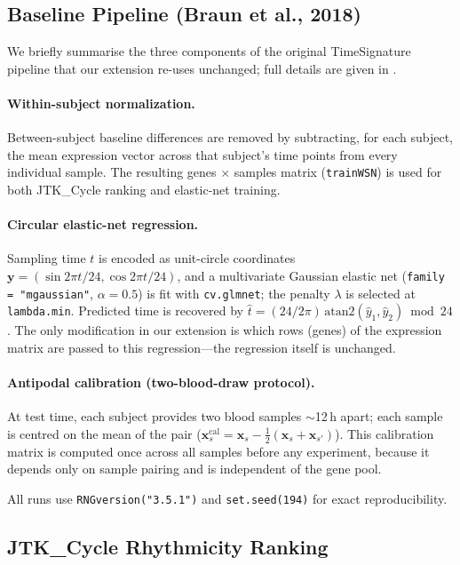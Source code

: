 \documentclass[10pt,a4paper]{article}
\begin{document}
\subsection{Baseline Pipeline (Braun et al., 2018)}
 
We briefly summarise the three components of the original
TimeSignature pipeline that our extension re-uses unchanged; full
details are given in \citet{Braun2018}.
 
\paragraph{Within-subject normalization.}
Between-subject baseline differences are removed by subtracting, for
each subject, the mean expression vector across that subject's time
points from every individual sample.
The resulting genes $\times$ samples matrix (\texttt{trainWSN}) is
used for both JTK\_Cycle ranking and elastic-net training.
 
\paragraph{Circular elastic-net regression.}
Sampling time $t$ is encoded as unit-circle coordinates
$\mathbf{y} = (\sin 2\pi t/24,\allowbreak \cos 2\pi t/24)$, and a
multivariate Gaussian elastic net
(\texttt{family\,=\,"mgaussian"}, $\alpha = 0.5$) is fit with
\texttt{cv.glmnet}; the penalty $\lambda$ is selected at
\texttt{lambda.min}.
Predicted time is recovered by
$\hat t = (24/2\pi)\,\mathrm{atan2}(\hat y_1,\hat y_2) \bmod 24$.
The only modification in our extension is which rows (genes) of the
expression matrix are passed to this regression---the regression
itself is unchanged.
 
\paragraph{Antipodal calibration (two-blood-draw protocol).}
At test time, each subject provides two blood samples
${\sim}$12\,h apart; each sample is centred on the mean of the pair
($\mathbf{x}_s^{\mathrm{cal}} = \mathbf{x}_s -
\tfrac{1}{2}(\mathbf{x}_s + \mathbf{x}_{s'})$).
This calibration matrix is computed once across all samples before
any experiment, because it depends only on sample pairing and is
independent of the gene pool.
 
All runs use \texttt{RNGversion("3.5.1")} and
\texttt{set.seed(194)} for exact reproducibility.
 
\subsection{JTK\_Cycle Rhythmicity Ranking}
 
\end{document}
